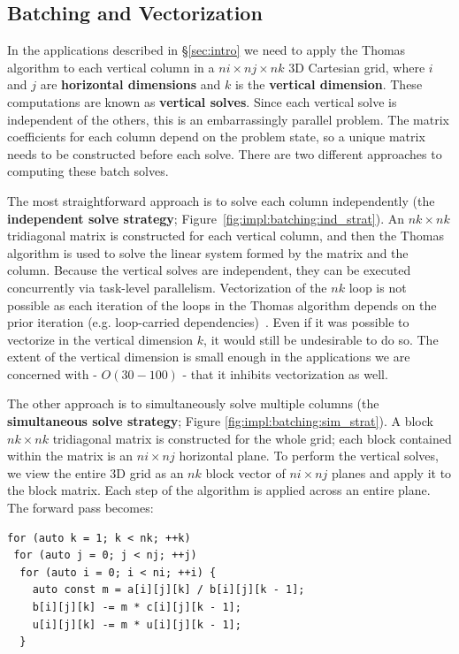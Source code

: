 \documentclass[10pt, conference, compsocconf]{IEEEtran}
\begin{document}
\subsection{Batching and Vectorization}
\label{sec:impl:batching_and_parallelism}

In the applications described in \S\ref{sec:intro} we need to apply the
  Thomas algorithm to each vertical column in a \(ni \times nj \times nk\)
  3D Cartesian grid, where \(i\) and \(j\) are \textbf{horizontal dimensions}
  and \(k\) is the \textbf{vertical dimension}.
These computations are known as \textbf{vertical solves}.
Since each vertical solve is independent of the others, this is an
  embarrassingly parallel problem.
The matrix coefficients for each column depend on the problem state, so a
  unique matrix needs to be constructed before each solve.
There are two different approaches to computing these batch solves.

The most straightforward approach is to solve each column independently
  (the \textbf{independent solve strategy}; Figure~\ref{fig:impl:batching:ind_strat}).
An \(nk \times nk\) tridiagonal matrix is constructed for each vertical column,
  and then the Thomas algorithm is used to solve the linear system formed by the
  matrix and the column.
Because the vertical solves are independent, they can be executed concurrently
  via task-level parallelism.
Vectorization of the \(nk\) loop is not possible as each iteration of the loops
  in the Thomas algorithm depends on the prior iteration (e.g.
  loop-carried dependencies)~\cite{pipelined_thomas_algorithm}.
Even if it was possible to vectorize in the vertical dimension \(k\), it would
  still be undesirable to do so.
The extent of the vertical dimension is small enough in the applications
  we are concerned with - \(O(30-100)\) - that it inhibits vectorization as
  well.

The other approach is to simultaneously solve multiple columns (the
  \textbf{simultaneous solve strategy}; Figure
  \ref{fig:impl:batching:sim_strat}).
A block \(nk \times nk\) tridiagonal matrix is
  constructed for the whole grid; each block contained within the matrix is
  an \(ni \times nj\) horizontal plane.
To perform the vertical solves, we view the entire 3D grid as an
  \(nk\) block vector of \(ni \times nj\) planes and apply it to the block
  matrix.
Each step of the algorithm is applied across an entire plane.
The forward pass becomes:
\begin{lstlisting}
for (auto k = 1; k < nk; ++k)
 for (auto j = 0; j < nj; ++j)
  for (auto i = 0; i < ni; ++i) {
    auto const m = a[i][j][k] / b[i][j][k - 1];
    b[i][j][k] -= m * c[i][j][k - 1];
    u[i][j][k] -= m * u[i][j][k - 1];
  } 
\end{lstlisting}
\end{document}
